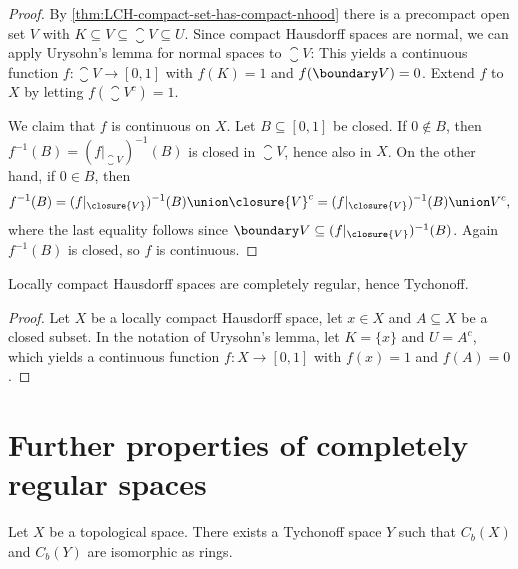 \documentclass[article, a4paper, 11pt, oneside]{memoir}
\numberwithin{equation}{chapter}
\newcommand{\preim}{^{-1}}
\newcommand{\calT}{\mathcal{T}}
\begin{document}
\begin{proof}
    By \cref{thm:LCH-compact-set-has-compact-nhood} there is a precompact open set $V$ with $K \subseteq V \subseteq \closure{V} \subseteq U$. Since compact Hausdorff spaces are normal, we can apply Urysohn's lemma for normal spaces to $\closure{V}$: This yields a continuous function $f \colon \closure{V} \to [0,1]$ with $f(K) = 1$ and $f(\boundary V) = 0$. Extend $f$ to $X$ by letting $f(\closure{V}^c) = 1$.

    We claim that $f$ is continuous on $X$. Let $B \subseteq [0,1]$ be closed. If $0 \not\in B$, then $f\preim(B) = (f|_{\closure{V}})\preim(B)$ is closed in $\closure{V}$, hence also in $X$. On the other hand, if $0 \in B$, then
    \begin{equation*}
        f\preim(B)
            = (f|_{\closure{V}})\preim(B) \union \closure{V}^c
            = (f|_{\closure{V}})\preim(B) \union V^c,
    \end{equation*}
    where the last equality follows since $\boundary V \subseteq (f|_{\closure{V}})\preim(B)$. Again $f\preim(B)$ is closed, so $f$ is continuous.
\end{proof}


\begin{corollary}
    Locally compact Hausdorff spaces are completely regular, hence Tychonoff.
\end{corollary}

\begin{proof}
    Let $X$ be a locally compact Hausdorff space, let $x \in X$ and $A \subseteq X$ be a closed subset. In the notation of Urysohn's lemma, let $K = \{x\}$ and $U = A^c$, which yields a continuous function $f \colon X \to [0,1]$ with $f(x) = 1$ and $f(A) = 0$.
\end{proof}


\section{Further properties of completely regular spaces}


\begin{proposition}
    Let $X$ be a topological space. There exists a Tychonoff space $Y$ such that $C_b(X)$ and $C_b(Y)$ are isomorphic as rings.
\end{proposition}
\end{document}
